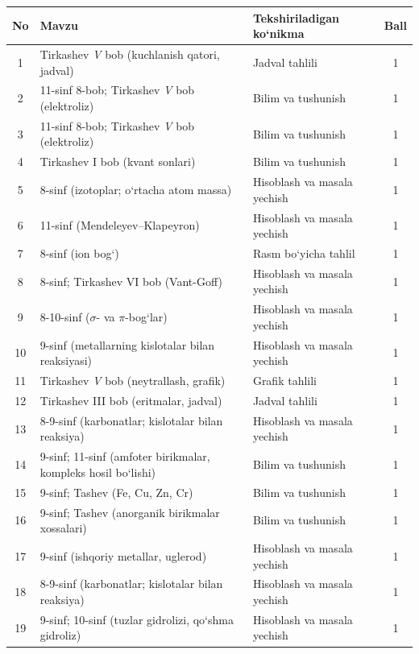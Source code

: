 \documentclass[11pt,a4paper]{article}
\begin{document}
{\small\noindent\begin{longtable}{|c|p{7.2cm}|p{5.4cm}|c|}\hline \textbf{No} & \textbf{Mavzu} & \textbf{Tekshiriladigan ko`nikma} & \textbf{Ball}\\\hline
1 & Tirkashev \textit{V} bob (kuchlanish qatori, jadval) & Jadval tahlili & 1\\\hline
2 & 11-sinf 8-bob; Tirkashev \textit{V} bob (elektroliz) & Bilim va tushunish & 1\\\hline
3 & 11-sinf 8-bob; Tirkashev \textit{V} bob (elektroliz) & Bilim va tushunish & 1\\\hline
4 & Tirkashev I bob (kvant sonlari) & Bilim va tushunish & 1\\\hline
5 & 8-sinf (izotoplar; o`rtacha atom massa) & Hisoblash va masala yechish & 1\\\hline
6 & 11-sinf (Mendeleyev--Klapeyron) & Hisoblash va masala yechish & 1\\\hline
7 & 8-sinf (ion bog`) & Rasm bo`yicha tahlil & 1\\\hline
8 & 8-sinf; Tirkashev VI bob (Vant-Goff) & Hisoblash va masala yechish & 1\\\hline
9 & 8-10-sinf ($\sigma$- va $\pi$-bog`lar) & Hisoblash va masala yechish & 1\\\hline
10 & 9-sinf (metallarning kislotalar bilan reaksiyasi) & Hisoblash va masala yechish & 1\\\hline
11 & Tirkashev \textit{V} bob (neytrallash, grafik) & Grafik tahlili & 1\\\hline
12 & Tirkashev III bob (eritmalar, jadval) & Jadval tahlili & 1\\\hline
13 & 8-9-sinf (karbonatlar; kislotalar bilan reaksiya) & Hisoblash va masala yechish & 1\\\hline
14 & 9-sinf; 11-sinf (amfoter birikmalar, kompleks hosil bo`lishi) & Bilim va tushunish & 1\\\hline
15 & 9-sinf; Tashev (Fe, Cu, Zn, Cr) & Bilim va tushunish & 1\\\hline
16 & 9-sinf; Tashev (anorganik birikmalar xossalari) & Bilim va tushunish & 1\\\hline
17 & 9-sinf (ishqoriy metallar, uglerod) & Hisoblash va masala yechish & 1\\\hline
18 & 8-9-sinf (karbonatlar; kislotalar bilan reaksiya) & Hisoblash va masala yechish & 1\\\hline
19 & 9-sinf; 10-sinf (tuzlar gidrolizi, qo`shma gidroliz) & Hisoblash va masala yechish & 1\\\hline

\end{longtable}}
\end{document}
